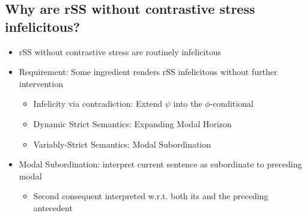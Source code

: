 \subsection{Why are rSS without contrastive stress infelicitous?}
\begin{frame}[t]
    \subsectionpage\vskip 9pt
    \begin{itemize}
        \item<1-> rSS without contrastive stress are routinely infelicitous\vskip 9pt
        \item<2-> Requirement: Some ingredient renders rSS infelicitous without further intervention\vskip 4.5pt
            \begin{itemize}
                \item<3-> Infelicity via contradiction: Extend {\color{Orange}$\psi$} into the {\color{red}$\phi$}-conditional
                \item<4-> Dynamic Strict Semantics: Expanding Modal Horizon
                \item<5-> Variably-Strict Semantics: Modal Subordination \citep{Klecha2014a}
            \end{itemize}\vskip 18pt
        \item<6-> Modal Subordination: interpret current sentence as subordinate to preceding modal\vskip 4.5pt
            \begin{itemize}
                \item<7-> Second consequent interpreted w.r.t. both its and the preceding antecedent
            \end{itemize}
    \end{itemize}
\end{frame}


